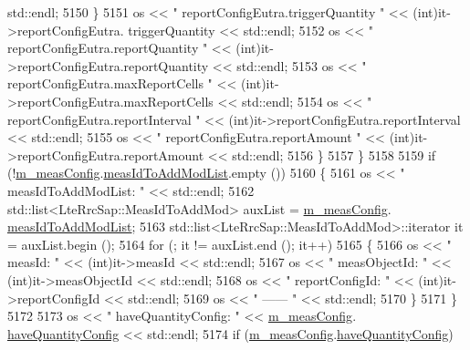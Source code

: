 \begin{DoxyCode}
      std::endl;
5150                 \}
5151               os << \textcolor{stringliteral}{"    reportConfigEutra.triggerQuantity  "} <<  (int)it->reportConfigEutra.
      triggerQuantity << std::endl;
5152               os << \textcolor{stringliteral}{"    reportConfigEutra.reportQuantity  "} <<  (\textcolor{keywordtype}{int})it->reportConfigEutra.reportQuantity 
      << std::endl;
5153               os << \textcolor{stringliteral}{"    reportConfigEutra.maxReportCells  "} <<  (int)it->reportConfigEutra.maxReportCells 
      << std::endl;
5154               os << \textcolor{stringliteral}{"    reportConfigEutra.reportInterval  "} <<  (\textcolor{keywordtype}{int})it->reportConfigEutra.reportInterval 
      << std::endl;
5155               os << \textcolor{stringliteral}{"    reportConfigEutra.reportAmount  "} <<  (int)it->reportConfigEutra.reportAmount << 
      std::endl;
5156             \}
5157         \}
5158 
5159       \textcolor{keywordflow}{if} (!\hyperlink{classns3_1_1RrcConnectionReconfigurationHeader_a5fd4a46dd4c2fdefd5fdaa4d6f51a198}{m\_measConfig}.\hyperlink{structns3_1_1LteRrcSap_1_1MeasConfig_ade3c8b430270fdbc2d1fdd0de3d71b3f}{measIdToAddModList}.empty ())
5160         \{
5161           os << \textcolor{stringliteral}{"  measIdToAddModList: "} << std::endl;
5162           std::list<LteRrcSap::MeasIdToAddMod> auxList = \hyperlink{classns3_1_1RrcConnectionReconfigurationHeader_a5fd4a46dd4c2fdefd5fdaa4d6f51a198}{m\_measConfig}.
      \hyperlink{structns3_1_1LteRrcSap_1_1MeasConfig_ade3c8b430270fdbc2d1fdd0de3d71b3f}{measIdToAddModList};
5163           std::list<LteRrcSap::MeasIdToAddMod>::iterator it = auxList.begin ();
5164           \textcolor{keywordflow}{for} (; it != auxList.end (); it++)
5165             \{
5166               os << \textcolor{stringliteral}{"    measId: "} << (int)it->measId << std::endl;
5167               os << \textcolor{stringliteral}{"    measObjectId: "} << (\textcolor{keywordtype}{int})it->measObjectId << std::endl;
5168               os << \textcolor{stringliteral}{"    reportConfigId: "} << (int)it->reportConfigId << std::endl;
5169               os << \textcolor{stringliteral}{"    ------ "} << std::endl;
5170             \}
5171         \}
5172 
5173       os << \textcolor{stringliteral}{"  haveQuantityConfig: "} << \hyperlink{classns3_1_1RrcConnectionReconfigurationHeader_a5fd4a46dd4c2fdefd5fdaa4d6f51a198}{m\_measConfig}.
      \hyperlink{structns3_1_1LteRrcSap_1_1MeasConfig_aeb84564bf645eef57fa27943afa868a4}{haveQuantityConfig} << std::endl;
5174       \textcolor{keywordflow}{if} (\hyperlink{classns3_1_1RrcConnectionReconfigurationHeader_a5fd4a46dd4c2fdefd5fdaa4d6f51a198}{m\_measConfig}.\hyperlink{structns3_1_1LteRrcSap_1_1MeasConfig_aeb84564bf645eef57fa27943afa868a4}{haveQuantityConfig})

\end{DoxyCode}
